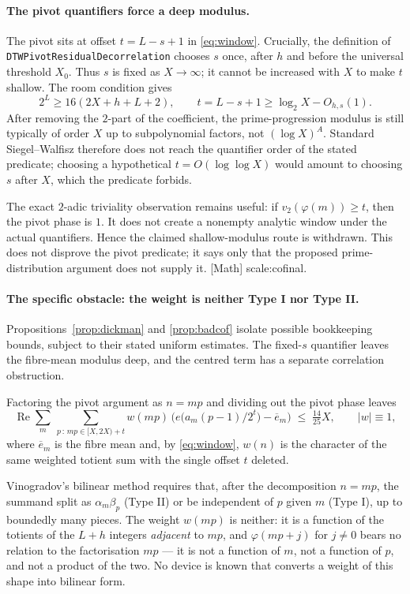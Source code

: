 \documentclass[11pt]{article}
\theoremstyle{plain}
\theoremstyle{definition}
\theoremstyle{remark}
\newcommand{\ev}[1]{{\small\textsf{[#1]}}\xspace}
\newcommand{\scale}[1]{{\small\textsf{scale:#1}}\xspace}
\begin{document}
\paragraph{The pivot quantifiers force a deep modulus.}
The pivot sits at offset $t=L-s+1$ in \eqref{eq:window}.  Crucially, the
definition of \texttt{DTWPivotResidualDecorrelation} chooses $s$ once, after
$h$ and before the universal threshold $X_0$.  Thus $s$ is fixed as
$X\to\infty$; it cannot be increased with $X$ to make $t$ shallow.  The room
condition gives
\[
  2^L\ge16(2X+h+L+2),\qquad
  t=L-s+1\ge\log_2X-O_{h,s}(1).
\]
After removing the $2$-part of the coefficient, the prime-progression modulus
is still typically of order $X$ up to subpolynomial factors, not
$(\log X)^A$.  Standard Siegel--Walfisz therefore does not reach the
quantifier order of the stated predicate; choosing a hypothetical
$t=O(\log\log X)$ would amount to choosing $s$ after $X$, which the predicate
forbids.

The exact $2$-adic triviality observation remains useful: if
$v_2(\varphi(m))\ge t$, then the pivot phase is $1$.  It does not create a
nonempty analytic window under the actual quantifiers.  Hence the claimed
shallow-modulus route is withdrawn.  This does not disprove the pivot
predicate; it says only that the proposed prime-distribution argument does
not supply it. \ev{Math} \scale{cofinal}.

\paragraph{The specific obstacle: the weight is neither Type I nor Type II.}
Propositions~\ref{prop:dickman} and \ref{prop:badcof} isolate possible
bookkeeping bounds, subject to their stated uniform estimates.  The
fixed-$s$ quantifier leaves the fibre-mean modulus deep, and the centred term
has a separate correlation obstruction.

Factoring the pivot argument as
$n=mp$ and dividing out the pivot phase leaves
\[
  \operatorname{Re}\sum_{m}\ \sum_{p\,:\,mp\in[X,2X)+t}
    w(mp)\,\bigl(e\bigl(a_m(p-1)/2^{t}\bigr)-\overline{e}_m\bigr)
  \;\le\;\tfrac{14}{25}X ,
  \qquad |w|\equiv 1 ,
\]
where $\overline{e}_m$ is the fibre mean and, by \eqref{eq:window}, $w(n)$ is
the character of the same weighted totient sum with the single offset $t$
deleted.

Vinogradov's bilinear method requires that, after the decomposition
$n=mp$, the summand split as $\alpha_m\beta_p$ (Type II) or be independent of
$p$ given $m$ (Type I), up to boundedly many pieces. The weight $w(mp)$ is
neither: it is a function of the totients of the $L+h$ integers
\emph{adjacent} to $mp$, and $\varphi(mp+j)$ for $j\ne0$ bears no relation to
the factorisation $mp$ --- it is not a function of $m$, not a function of
$p$, and not a product of the two. No device is known that converts a weight
of this shape into bilinear form.
\end{document}

